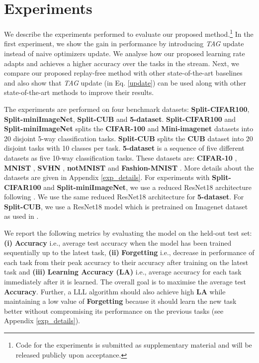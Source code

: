 \documentclass{article} \usepackage{collas2022_conference,times}
\begin{document}
\section{Experiments}\label{exp_sec}

We describe the experiments performed to evaluate our proposed method.\footnote{Code for the experiments is submitted as supplementary material and will be released publicly upon acceptance.} 
In the first experiment, we show the gain in performance by introducing \textit{TAG} update instead of naive optimizers update. We analyse how our proposed learning rate adapts and achieves a higher accuracy over the tasks in the stream. Next, we compare our proposed replay-free method with other state-of-the-art baselines and also show that \textit{TAG} update (in Eq. \ref{update}) can be used along with other state-of-the-art methods to improve their results. 

    The experiments are performed on four benchmark datasets: \textbf{Split-CIFAR100}, \textbf{Split-miniImageNet}, \textbf{Split-CUB} and \textbf{5-dataset}. \textbf{Split-CIFAR100} and \textbf{Split-miniImageNet} splits the \textbf{CIFAR-100} \citep{krizhevsky2009learning,mirzadeh2020understanding} and \textbf{Mini-imagenet} \citep{vinyals2016matching,chaudhry2019tiny} datasets into 20 disjoint 5-way classification tasks. \textbf{Split-CUB} splits the \textbf{CUB} \citep{wah2011caltech} dataset into 20 disjoint tasks with 10 classes per task. \textbf{5-dataset} is a sequence of five different datasets as five 10-way classification tasks. These datasets are: \textbf{CIFAR-10} \citep{krizhevsky2009learning}, \textbf{MNIST} \citep{mnist}, \textbf{SVHN} \citep{netzer2011reading}, \textbf{notMNIST} \citep{notmnist} and \textbf{Fashion-MNIST} \citep{xiao2017fashion}. More details about the datasets are given in Appendix \ref{exp_details}.
For experiments with \textbf{Split-CIFAR100} and \textbf{Split-miniImageNet}, we use a reduced ResNet18 architecture following \citep{lopez2017gradient,chaudhry2019tiny}. We use the same reduced ResNet18 architecture for \textbf{5-dataset}. For \textbf{Split-CUB}, we use a ResNet18 model which is pretrained on Imagenet dataset \citep{imagenet_cvpr09} as used in \citep{chaudhry2019tiny}. 

    We report the following metrics by evaluating the model on the held-out test set: \textbf{(i)} \textbf{Accuracy} \citep{lopez2017gradient} i.e., average test accuracy when the model has been trained sequentially up to the latest task, \textbf{(ii)} \textbf{Forgetting} \citep{chaudhry2018riemannian} i.e., decrease in performance of each task from their peak accuracy to their accuracy after training on the latest task and \textbf{(iii)} \textbf{Learning Accuracy (LA)} \citep{riemer2018learning} i.e., average accuracy for each task immediately after it is learned.
    The overall goal is to maximise the average test \textbf{Accuracy}. Further, a LLL algorithm should also achieve high \textbf{LA} while maintaining a low value of \textbf{Forgetting} because it should learn the new task better without compromising its performance on the previous tasks (see Appendix \ref{exp_details}).
\end{document}
